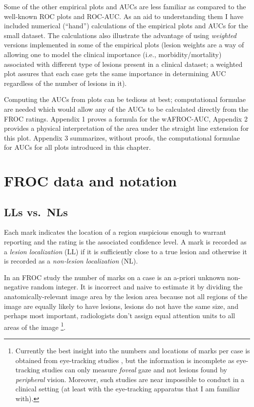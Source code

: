 \documentclass[
]{book}
\begin{document}
Some of the other empirical plots and AUCs are less familiar as compared to the well-known ROC plots and ROC-AUC. As an aid to understanding them I have included numerical (``hand'') calculations of the empirical plots and AUCs for the small dataset. The calculations also illustrate the advantage of using \emph{weighted} versions implemented in some of the empirical plots (lesion weights are a way of allowing one to model the clinical importance (i.e., morbidity/mortality) associated with different type of lesions present in a clinical dataset; a weighted plot assures that each case gets the same importance in determining AUC regardless of the number of lesions in it).

Computing the AUCs from plots can be tedious at best; computational formulae are needed which would allow any of the AUCs to be calculated directly from the FROC ratings. Appendix 1 proves a formula for the wAFROC-AUC, Appendix 2 provides a physical interpretation of the area under the straight line extension for this plot. Appendix 3 summarizes, without proofs, the computational formulae for AUCs for all plots introduced in this chapter.

\hypertarget{empirical-mark-rating-pairs}{%
\section{FROC data and notation}\label{empirical-mark-rating-pairs}}

\hypertarget{lls-vs.-nls}{%
\subsection{LLs vs.~NLs}\label{lls-vs.-nls}}

Each mark indicates the location of a region suspicious enough to warrant reporting and the rating is the associated confidence level. A mark is recorded as a \emph{lesion localization} (LL) if it is sufficiently close to a true lesion and otherwise it is recorded as a \emph{non-lesion localization} (NL).

In an FROC study the number of marks on a case is an a-priori unknown non-negative random integer. It is incorrect and naive to estimate it by dividing the anatomically-relevant image area by the lesion area because not all regions of the image are equally likely to have lesions, lesions do not have the same size, and perhaps most important, radiologists don't assign equal attention units to all areas of the image \footnote{Currently the best insight into the numbers and locations of marks per case is obtained from eye-tracking studies \citep{duchowski2017eye}, but the information is incomplete as eye-tracking studies can only measure \emph{foveal} gaze and not lesions found by \emph{peripheral} vision. Moreover, such studies are near impossible to conduct in a clinical setting (at least with the eye-tracking apparatus that I am familiar with).}.
\end{document}
